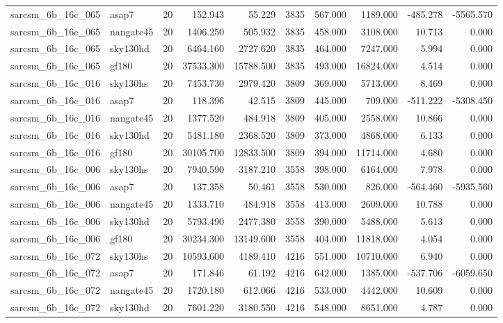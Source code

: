 \begin{tabular}{llrrrrrrrr}
sarcsm\_6b\_16c\_065 & asap7 & 20 & 152.943 & 55.229 & 3835 & 567.000 & 1189.000 & -485.278 & -5565.570 \\
sarcsm\_6b\_16c\_065 & nangate45 & 20 & 1406.250 & 505.932 & 3835 & 458.000 & 3108.000 & 10.713 & 0.000 \\
sarcsm\_6b\_16c\_065 & sky130hd & 20 & 6464.160 & 2727.620 & 3835 & 464.000 & 7247.000 & 5.994 & 0.000 \\
sarcsm\_6b\_16c\_065 & gf180 & 20 & 37533.300 & 15788.500 & 3835 & 493.000 & 16824.000 & 4.514 & 0.000 \\
sarcsm\_6b\_16c\_016 & sky130hs & 20 & 7453.730 & 2979.420 & 3809 & 369.000 & 5713.000 & 8.469 & 0.000 \\
sarcsm\_6b\_16c\_016 & asap7 & 20 & 118.396 & 42.515 & 3809 & 445.000 & 709.000 & -511.222 & -5308.450 \\
sarcsm\_6b\_16c\_016 & nangate45 & 20 & 1377.520 & 484.918 & 3809 & 405.000 & 2558.000 & 10.866 & 0.000 \\
sarcsm\_6b\_16c\_016 & sky130hd & 20 & 5481.180 & 2368.520 & 3809 & 373.000 & 4868.000 & 6.133 & 0.000 \\
sarcsm\_6b\_16c\_016 & gf180 & 20 & 30105.700 & 12833.500 & 3809 & 394.000 & 11714.000 & 4.680 & 0.000 \\
sarcsm\_6b\_16c\_006 & sky130hs & 20 & 7940.590 & 3187.210 & 3558 & 398.000 & 6164.000 & 7.978 & 0.000 \\
sarcsm\_6b\_16c\_006 & asap7 & 20 & 137.358 & 50.461 & 3558 & 530.000 & 826.000 & -564.460 & -5935.560 \\
sarcsm\_6b\_16c\_006 & nangate45 & 20 & 1333.710 & 484.918 & 3558 & 413.000 & 2609.000 & 10.788 & 0.000 \\
sarcsm\_6b\_16c\_006 & sky130hd & 20 & 5793.490 & 2477.380 & 3558 & 390.000 & 5488.000 & 5.613 & 0.000 \\
sarcsm\_6b\_16c\_006 & gf180 & 20 & 30234.300 & 13149.600 & 3558 & 404.000 & 11818.000 & 4.054 & 0.000 \\
sarcsm\_6b\_16c\_072 & sky130hs & 20 & 10593.600 & 4189.410 & 4216 & 551.000 & 10710.000 & 6.940 & 0.000 \\
sarcsm\_6b\_16c\_072 & asap7 & 20 & 171.846 & 61.192 & 4216 & 642.000 & 1385.000 & -537.706 & -6059.650 \\
sarcsm\_6b\_16c\_072 & nangate45 & 20 & 1720.180 & 612.066 & 4216 & 533.000 & 4442.000 & 10.609 & 0.000 \\
sarcsm\_6b\_16c\_072 & sky130hd & 20 & 7601.220 & 3180.550 & 4216 & 548.000 & 8651.000 & 4.787 & 0.000 \\

\end{tabular}
